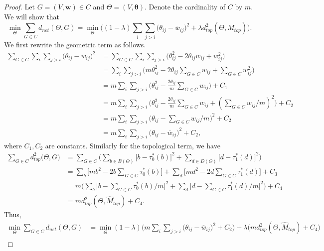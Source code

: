 \documentclass{article} %
\begin{document}
\begin{proof}
Let $G=(V,\bm{w}) \in C$ and $\Theta=(V,\bm{\theta})$. Denote the cardinality of $C$ by $m$. We will show that
\[\min_{\Theta} \sum_{G \in C} d_{net}(\Theta,G) = \min_{\Theta} \Big( (1-\lambda)\sum_{i}\sum_{j>i} \big(\theta_{ij} - \overline w_{ij} \big)^2 + \lambda d_{top}^2(\Theta, \widehat M_{top}) \Big).\]
We first rewrite the geometric term as follows.
\begin{equation*}
\begin{split}
    \sum_{G \in C} \sum_{i}\sum_{j>i} \big(\theta_{ij} - w_{ij} \big)^2 &= \sum_{G \in C} \sum_{i}\sum_{j>i} \big(\theta_{ij}^2 - 2\theta_{ij}w_{ij} + w_{ij}^2 \big) \\ 
    &= \sum_{i}\sum_{j>i} \big(m\theta_{ij}^2 - 2\theta_{ij} \sum_{G \in C}w_{ij} + \sum_{G \in C}w_{ij}^2 \big) \\
    &= m\sum_{i}\sum_{j>i} \big(\theta_{ij}^2 - \frac{2\theta_{ij}}{m} \sum_{G \in C}w_{ij} \big) + C_1 \\
    &= m\sum_{i}\sum_{j>i} \big(\theta_{ij}^2 - \frac{2\theta_{ij}}{m} \sum_{G \in C}w_{ij} + (\sum_{G \in C}w_{ij}/m)^2 \big) + C_2 \\
    &= m\sum_{i}\sum_{j>i} \big(\theta_{ij} - \sum_{G \in C}w_{ij}/m \big)^2 + C_2 \\
    &= m\sum_{i}\sum_{j>i} \big(\theta_{ij} - \overline w_{ij} \big)^2 + C_2,
\end{split}
\end{equation*}
where $C_1,C_2$ are constants. Similarly for the topological term, we have
\begin{equation*}
\begin{split}
    \sum_{G \in C} d^2_{top}\big(\Theta,G \big) &= \sum_{G \in C} \Big( \sum_{b \in B(\Theta)} \big[ b - \tau_0^*(b)\big]^2 + \sum_{d \in D(\Theta)} \big[ d - \tau_1^*(d)\big]^2 \Big) \\
    &= \sum_{b} \big[ mb^2 - 2b \sum_{G \in C}\tau_0^*(b) \big] + \sum_{d} \big[ md^2 - 2d \sum_{G \in C} \tau_1^*(d)\big] + C_3 \\
    &= m \Big(\sum_{b} \big[ b - \sum_{G \in C}\tau_0^*(b)/m \big]^2 + \sum_{d} \big[ d - \sum_{G \in C} \tau_1^*(d)/m \big]^2 \Big) + C_4 \\
    &= m d_{top}^2(\Theta, \widehat M_{top}) + C_4.
\end{split}
\end{equation*}
Thus,
\begin{equation*}
\begin{split}
    \min_{\Theta} \sum_{G \in C} d_{net}(\Theta,G) &= \min_{\Theta} (1-\lambda) \Big( m\sum_{i}\sum_{j>i} \big(\theta_{ij} - \overline w_{ij} \big)^2 + C_2 \Big) + \lambda \Big( m d_{top}^2(\Theta, \widehat M_{top}) + C_4 \Big) \\

\end{split}
\end{equation*}
\end{proof}
\end{document}
